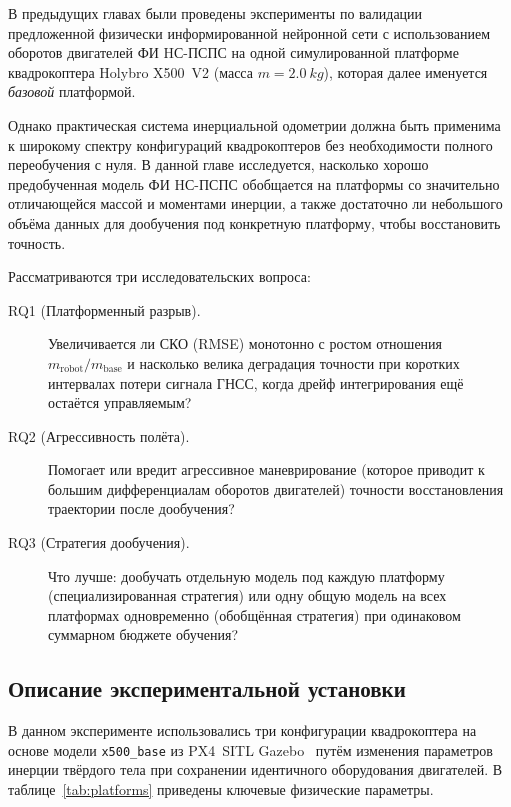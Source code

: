 В предыдущих главах были проведены эксперименты по валидации предложенной физически информированной нейронной сети с использованием оборотов двигателей ФИ HС-ПСПС на одной симулированной платформе квадрокоптера Holybro X500~V2 (масса $m=\SI{2.0}{kg}$), которая далее именуется \emph{базовой} платформой.

Однако практическая система инерциальной одометрии должна быть применима к широкому спектру конфигураций квадрокоптеров без необходимости полного переобучения с нуля. В данной главе исследуется, насколько хорошо предобученная модель ФИ HС-ПСПС обобщается на платформы со значительно отличающейся массой и моментами инерции, а также достаточно ли небольшого объёма данных для дообучения под конкретную платформу, чтобы восстановить точность.

Рассматриваются три исследовательских вопроса:

\begin{description}
	\item[RQ1 (Платформенный разрыв).] Увеличивается ли СКО (RMSE) монотонно с ростом отношения $m_{\mathrm{robot}}/m_{\mathrm{base}}$ и насколько велика деградация точности при коротких интервалах потери сигнала ГНСС, когда дрейф интегрирования ещё остаётся управляемым?
	\item[RQ2 (Агрессивность полёта).] Помогает или вредит агрессивное маневрирование (которое приводит к большим дифференциалам оборотов двигателей) точности восстановления траектории после дообучения?
	\item[RQ3 (Стратегия дообучения).] Что лучше: дообучать отдельную модель под каждую платформу (специализированная стратегия) или одну общую модель на всех платформах одновременно (обобщённая стратегия) при одинаковом суммарном бюджете обучения?
\end{description}

\subsection{Описание экспериментальной установки}
\label{sec:mp_setup}


В данном эксперименте использовались три конфигурации квадрокоптера на основе модели \texttt{x500\_base} из PX4~SITL Gazebo~\cite{holybro_x500} путём изменения параметров инерции твёрдого тела при сохранении идентичного оборудования двигателей. В таблице~\ref{tab:platforms} приведены ключевые физические параметры.

